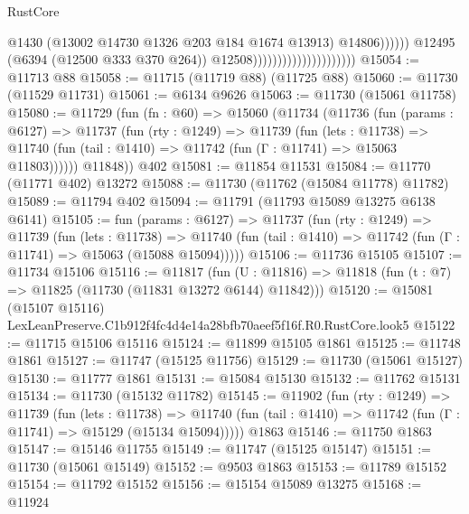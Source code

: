 \begin{lexlean}{RustCore}
\begin{coremodule}
                                                          @1430
                                                          (@13002
                                                            @14730
                                                            @1326
                                                            @203
                                                            @184
                                                            @1674
                                                            @13913)
                                                          @14806))))))
                                              @12495
                                              (@6394 (@12500 @333 @370 @264))
                                              @12508)))))))))))))))))))))
@15054 := @11713 @88
@15058 := @11715 (@11719 @88) (@11725 @88)
@15060 := @11730 (@11529 @11731)
@15061 := @6134 @9626
@15063 := @11730 (@15061 @11758)
@15080 := @11729
    (fun (fn : @60) =>
    @15060
      (@11734
        (@11736
          (fun (params : @6127) =>
          @11737
            (fun (rty : @1249) =>
            @11739
              (fun (lets : @11738) =>
              @11740 (fun (tail : @1410) => @11742 (fun (Γ : @11741) => @15063 @11803))))))
        @11848))
    @402
@15081 := @11854 @11531
@15084 := @11770 (@11771 @402) @13272
@15088 := @11730 (@11762 (@15084 @11778) @11782)
@15089 := @11794 @402
@15094 := @11791 (@11793 @15089 @13275 @6138 @6141)
@15105 := fun (params : @6127) =>
  @11737
    (fun (rty : @1249) =>
    @11739
      (fun (lets : @11738) =>
      @11740 (fun (tail : @1410) => @11742 (fun (Γ : @11741) => @15063 (@15088 @15094)))))
@15106 := @11736 @15105
@15107 := @11734 @15106
@15116 := @11817
    (fun (U : @11816) => @11818 (fun (t : @7) => @11825 (@11730 (@11831 @13272 @6144) @11842)))
@15120 := @15081 (@15107 @15116) LexLeanPreserve.C1b912f4fc4d4e14a28bfb70aeef5f16f.R0.RustCore.look5
@15122 := @11715 @15106 @15116
@15124 := @11899 @15105 @1861
@15125 := @11748 @1861
@15127 := @11747 (@15125 @11756)
@15129 := @11730 (@15061 @15127)
@15130 := @11777 @1861
@15131 := @15084 @15130
@15132 := @11762 @15131
@15134 := @11730 (@15132 @11782)
@15145 := @11902
    (fun (rty : @1249) =>
    @11739
      (fun (lets : @11738) =>
      @11740 (fun (tail : @1410) => @11742 (fun (Γ : @11741) => @15129 (@15134 @15094)))))
    @1863
@15146 := @11750 @1863
@15147 := @15146 @11755
@15149 := @11747 (@15125 @15147)
@15151 := @11730 (@15061 @15149)
@15152 := @9503 @1863
@15153 := @11789 @15152
@15154 := @11792 @15152
@15156 := @15154 @15089 @13275
@15168 := @11924

\end{coremodule}
\end{lexlean}
